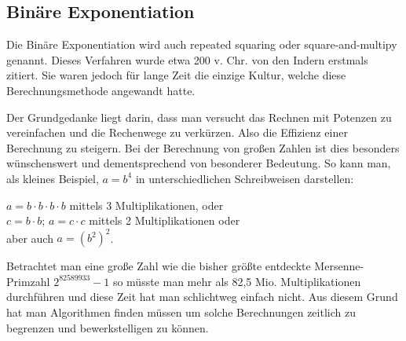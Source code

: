\documentclass[12pt,a4paper]{article}
\theoremstyle{definition}
\begin{document}
\subsection{Binäre Exponentiation}
Die Binäre Exponentiation wird auch repeated squaring oder square-and-multipy genannt.
Dieses Verfahren wurde etwa 200 v. Chr. von den Indern erstmals zitiert.
Sie waren jedoch für lange Zeit die einzige Kultur, welche diese Berechnungsmethode angewandt hatte.

Der Grundgedanke liegt darin, dass man versucht das Rechnen mit Potenzen zu vereinfachen und die Rechenwege zu verkürzen.
Also die Effizienz einer Berechnung zu steigern.
Bei der Berechnung von großen Zahlen ist dies besonders wünschenswert und dementsprechend von besonderer Bedeutung.
So kann man, als kleines Beispiel, $a = b^4$ in unterschiedlichen Schreibweisen darstellen:
\begin{center}
$a = b \cdot b \cdot b \cdot b$ mittels 3 Multiplikationen, oder \\
$c = b \cdot b$; $a = c \cdot c$ mittels 2 Multiplikationen oder \\
aber auch $a = (b^2)^2$.
\end{center}

Betrachtet man eine große Zahl wie die bisher größte entdeckte Mersenne-Primzahl $2^{82589933} - 1$ so müsste man mehr als 82,5 Mio. Multiplikationen durchführen und diese Zeit hat man schlichtweg einfach nicht.
Aus diesem Grund hat man Algorithmen finden müssen um solche Berechnungen zeitlich zu begrenzen und bewerkstelligen zu können.
\end{document}
